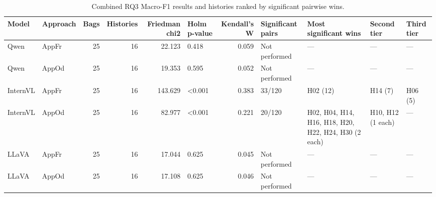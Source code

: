 \begin{table}[tbp]
\caption{Combined RQ3 Macro-F1 results and histories ranked by significant pairwise wins.}
\label{tab:rq3-macro-f1-final-summary}
\begin{tabular}{llrrrlrllll}
\toprule
Model & Approach & Bags & Histories & Friedman chi2 & Holm p-value & Kendall's W & Significant pairs & Most significant wins & Second tier & Third tier \\
\midrule
Qwen & AppFr & 25 & 16 & 22.123 & 0.418 & 0.059 & Not performed & — & — & — \\
Qwen & AppOd & 25 & 16 & 19.353 & 0.595 & 0.052 & Not performed & — & — & — \\
InternVL & AppFr & 25 & 16 & 143.629 & <0.001 & 0.383 & 33/120 & H02 (12) & H14 (7) & H06 (5) \\
InternVL & AppOd & 25 & 16 & 82.977 & <0.001 & 0.221 & 20/120 & H02, H04, H14, H16, H18, H20, H22, H24, H30 (2 each) & H10, H12 (1 each) & — \\
LLaVA & AppFr & 25 & 16 & 17.044 & 0.625 & 0.045 & Not performed & — & — & — \\
LLaVA & AppOd & 25 & 16 & 17.108 & 0.625 & 0.046 & Not performed & — & — & — \\
\bottomrule
\end{tabular}
\end{table}
